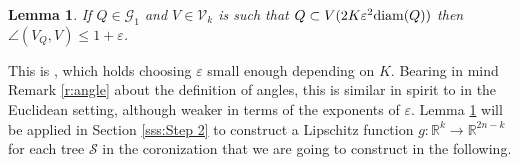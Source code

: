 \documentclass[12pt]{amsart}
\newcommand{\diam}{{\rm diam}}
\numberwithin{equation}{section}
\theoremstyle{plain}
\newtheorem{lemma}[theorem]{Lemma}
\theoremstyle{definition}
\theoremstyle{remark}
\begin{document}
\begin{lemma}\label{l:HahLem3.2}
    If $Q\in \mathcal{G}_1$ and $V\in \mathcal{V}_k$ is such that $Q\subset V(2K\varepsilon^2\diam(Q))$ then $\angle(V_Q ,V)\leq 1+\varepsilon$.
\end{lemma}

This is 
\cite[Lemma 3.2]{Hahlomaa}, which holds choosing $\varepsilon$ small enough depending on $K$.
Bearing in mind Remark \ref{r:angle} about the definition of angles, this is similar in spirit to  \cite[Lemma 5.13]{David1} in the Euclidean setting, although weaker in terms of the exponents of $\varepsilon$. Lemma \ref{l:HahLem3.2} will be applied in Section \ref{sss:Step 2} to construct a Lipschitz function $g:\mathbb{R}^k \to \mathbb{R}^{2n-k}$ for each tree $\mathcal{S}$ in the coronization that we are going to construct in the following. 
\end{document}
